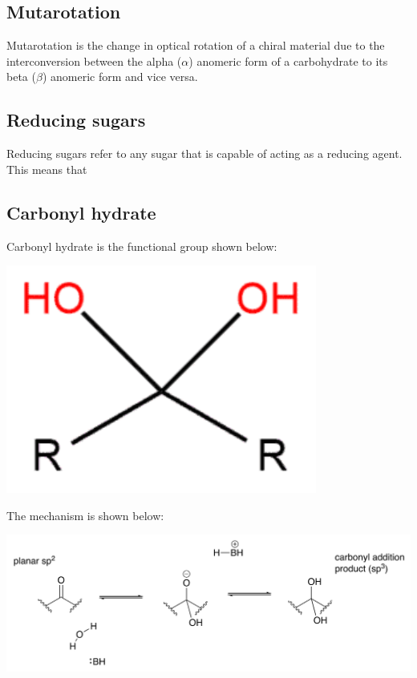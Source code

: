 \documentclass[11pt]{article}
\begin{document}
\subsection{Mutarotation}
\label{sec:orgdfedb84}
Mutarotation is the change in optical rotation of a chiral material due to the interconversion between the alpha (\(\alpha\)) anomeric form of a carbohydrate to its beta (\(\beta\)) anomeric form and vice versa.
\subsection{Reducing sugars}
\label{sec:org14dd24d}
Reducing sugars refer to any sugar that is capable of acting as a reducing agent. This means that
\subsection{Carbonyl hydrate}
\label{sec:org2de337e}
Carbonyl hydrate is the functional group shown below:

\begin{center}
\includegraphics[scale=1.0]{./images/carbonyl-hydrate.png}
\end{center}

The mechanism is shown below:
\begin{center}
\includegraphics[width=.9\linewidth]{./images/carbonyl-hydrate-mechanism.png}
\end{center}
\end{document}
